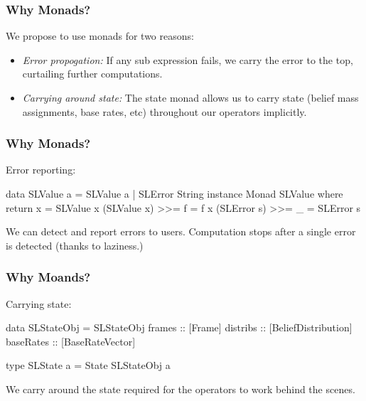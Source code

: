 \documentclass{beamer}
\begin{document}






\begin{frame}
\frametitle{Why Monads?}

We propose to use monads for two reasons:

\begin{itemize}
  \item \emph{Error propogation:} If any sub expression fails, we carry the
    error to the top, curtailing further computations.
  \item \emph{Carrying around state:} The state monad allows us to carry state
    (belief mass assignments, base rates, etc) throughout our operators implicitly.
\end{itemize}

\end{frame}


\begin{frame}[fragile]
\frametitle{Why Monads?}

Error reporting:

\begin{code}
data SLValue a = SLValue a | SLError String
instance Monad SLValue where
  return x = SLValue x
  (SLValue x) >>= f = f x
  (SLError s) >>= _ = SLError s
\end{code}

We can detect and report errors to users. Computation stops after a single
error is detected (thanks to laziness.)

\end{frame}


\begin{frame}[fragile]
\frametitle{Why Moands?}

Carrying state:

\begin{code}
data SLStateObj = SLStateObj {
  frames :: [Frame]
  distribs :: [BeliefDistribution]
  baseRates :: [BaseRateVector]
}

type SLState a = State SLStateObj a
\end{code}

We carry around the state required for the operators to work behind the scenes.

\end{frame}
\end{document}
